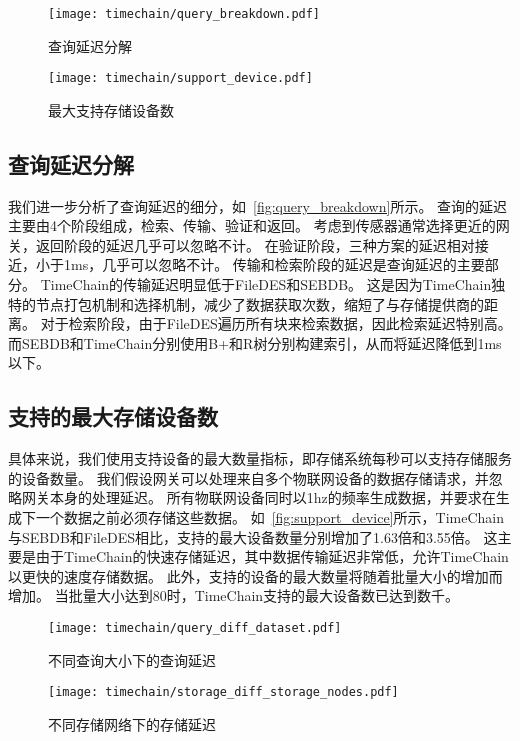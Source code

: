 \begin{figure*}[t]
    \centering
    \begin{minipage}{0.48\linewidth}
        \centering
        \texttt{[image: timechain/query\_breakdown.pdf]}
        \caption{查询延迟分解}
        \label{fig:query_breakdown}
	\end{minipage}
	\quad
	\begin{minipage}{0.48\linewidth}
        \centering
        \texttt{[image: timechain/support\_device.pdf]}
        \caption{最大支持存储设备数}
        \label{fig:support_device}
    \end{minipage}
\end{figure*}

\subsection{查询延迟分解}
我们进一步分析了查询延迟的细分，如~\autoref{fig:query_breakdown}所示。
查询的延迟主要由4个阶段组成，检索、传输、验证和返回。
考虑到传感器通常选择更近的网关，返回阶段的延迟几乎可以忽略不计。
在验证阶段，三种方案的延迟相对接近，小于1ms，几乎可以忽略不计。
传输和检索阶段的延迟是查询延迟的主要部分。
TimeChain的传输延迟明显低于FileDES和SEBDB。
这是因为TimeChain独特的节点打包机制和选择机制，减少了数据获取次数，缩短了与存储提供商的距离。
对于检索阶段，由于FileDES遍历所有块来检索数据，因此检索延迟特别高。
而SEBDB和TimeChain分别使用B+和R树分别构建索引，从而将延迟降低到1ms以下。

\subsection{支持的最大存储设备数}
具体来说，我们使用支持设备的最大数量指标，即存储系统每秒可以支持存储服务的设备数量。
我们假设网关可以处理来自多个物联网设备的数据存储请求，并忽略网关本身的处理延迟。
所有物联网设备同时以1hz的频率生成数据，并要求在生成下一个数据之前必须存储这些数据。
如~\autoref{fig:support_device}所示，TimeChain与SEBDB和FileDES相比，支持的最大设备数量分别增加了1.63倍和3.55倍。
这主要是由于TimeChain的快速存储延迟，其中数据传输延迟非常低，允许TimeChain以更快的速度存储数据。
此外，支持的设备的最大数量将随着批量大小的增加而增加。
当批量大小达到80时，TimeChain支持的最大设备数已达到数千。

\begin{figure}[t]
    \centering
	\begin{minipage}{0.45\linewidth}
        \centering
        \texttt{[image: timechain/query\_diff\_dataset.pdf]}
        \caption{不同查询大小下的查询延迟}
        \label{fig:query_diff_dataset}
	\end{minipage}
	\quad
	\begin{minipage}{0.45\linewidth}
        \centering
        \texttt{[image: timechain/storage\_diff\_storage\_nodes.pdf]}
        \caption{不同存储网络下的存储延迟}
        \label{fig:storage_diff_storage_nodes}
    \end{minipage}
\end{figure}

